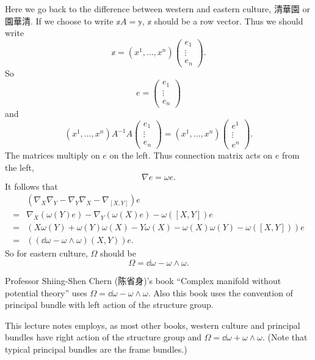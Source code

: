 \documentclass[12pt]{article}
\begin{document}
Here we go back to the difference between western and eastern culture,
{清華園} or {園華清}. If we choose to write
\(\mathbb{x}A=\mathbb{y}\), \(\mathbb{x}\) should be a row vector. Thus we should
write \[
    \mathbb{x}=(x^1,\ldots,x^n)\begin{pmatrix}
        e_1 \\ \vdots \\ e_n
    \end{pmatrix}
.\] So \[
    e=\begin{pmatrix} e_1\\ \vdots\\ e_n \end{pmatrix}
\] and \[
    (x^1,\ldots,x^n)A^{-1}A\begin{pmatrix} e_1\\ \vdots\\ e_n \end{pmatrix}
    =(x^1,\ldots,x^n)\begin{pmatrix} e^1\\ \vdots\\ e^n \end{pmatrix}
.\] The matrices multiply on \(e\) on the left. Thus connection matrix acts on \(e\)
from the left, \ie\ \[
    \nabla e=\omega e
.\] It follows that
\begin{align*}
    &(\nabla_X\nabla_Y-\nabla_Y\nabla_X-\nabla_{[X,Y]})e \\
    =&\nabla_X(\omega(Y)e)-\nabla_Y(\omega(X)e)-\omega([X,Y])e \\
    =&(X\omega(Y)+\omega(Y)\omega(X)-Y\omega(X)-\omega(X)\omega(Y)
    -\omega([X,Y]))e \\
    =&((\dd{\omega}-\omega\wedge \omega)(X,Y))e
.\end{align*}
So for eastern culture, \(\Omega\) should be \[
    \Omega=\dd{\omega}-\omega\wedge \omega
.\] 

\begin{remark}
    Professor Shiing-Shen Chern ({陈省身})'s book
    ``Complex manifold without potential theory'' uses
    \(\Omega=\dd{\omega}-\omega\wedge \omega\). Also this book uses the convention of
    principal bundle with left action of the structure group.

    This lecture notes employs, as most other books, western culture and principal
    bundles have right action of the structure group and \(\Omega=\dd{\omega}+\omega
    \wedge\omega\). (Note that typical principal bundles are the frame bundles.)
\end{remark}
\end{document}
